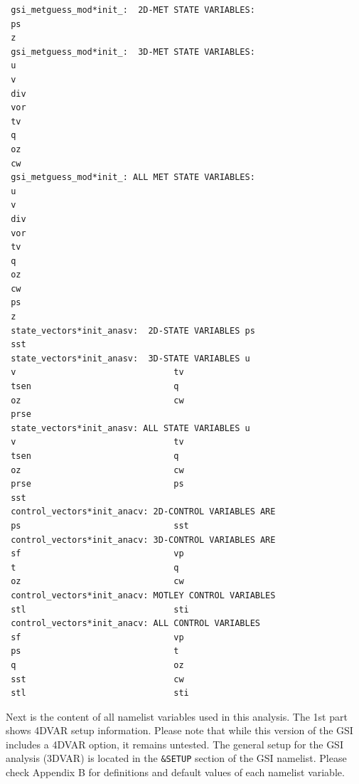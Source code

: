 \begin{scriptsize}
\begin{verbatim}
 gsi_metguess_mod*init_:  2D-MET STATE VARIABLES:
 ps
 z
 gsi_metguess_mod*init_:  3D-MET STATE VARIABLES:
 u
 v
 div
 vor
 tv
 q
 oz
 cw
 gsi_metguess_mod*init_: ALL MET STATE VARIABLES:
 u
 v
 div
 vor
 tv
 q
 oz
 cw
 ps
 z
 state_vectors*init_anasv:  2D-STATE VARIABLES ps
 sst
 state_vectors*init_anasv:  3D-STATE VARIABLES u
 v                               tv
 tsen                            q
 oz                              cw
 prse
 state_vectors*init_anasv: ALL STATE VARIABLES u
 v                               tv
 tsen                            q
 oz                              cw
 prse                            ps
 sst
 control_vectors*init_anacv: 2D-CONTROL VARIABLES ARE
 ps                              sst
 control_vectors*init_anacv: 3D-CONTROL VARIABLES ARE
 sf                              vp
 t                               q
 oz                              cw
 control_vectors*init_anacv: MOTLEY CONTROL VARIABLES
 stl                             sti
 control_vectors*init_anacv: ALL CONTROL VARIABLES
 sf                              vp
 ps                              t
 q                               oz
 sst                             cw
 stl                             sti
\end{verbatim}
\end{scriptsize}

Next is the content of all namelist variables used in this analysis. The 1st part shows 4DVAR setup information. Please note that while this version of the GSI includes a 4DVAR option, it remains untested. The general setup for the GSI analysis (3DVAR) is located in the \verb|&SETUP| section of the GSI namelist. Please check Appendix B for definitions and default values of each namelist variable. 

